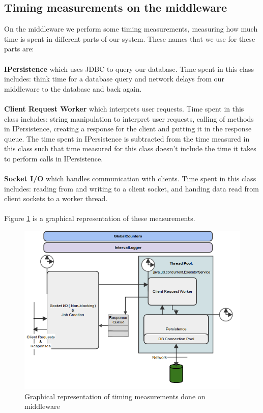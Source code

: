 \documentclass{article}
\begin{document}
        \subsection{Timing measurements on the middleware}
            On the middleware we perform some timing measurements, measuring how much time is spent in different parts of our system. These names that we use for these parts are:\\
            \\
            \indent \textbf{IPersistence} which uses JDBC to query our database. Time spent in this class includes: think time for a database query and network delays from our middleware to the database and back again.\\
            \\
            \indent \textbf{Client Request Worker} which interprets user requests. Time spent in this class includes: string manipulation to interpret user requests, calling of methods in IPersistence, creating a response for the client and putting it in the response queue. The time spent in IPersistence is subtracted from the time measured in this class such that time measured for this class doesn't include the time it takes to perform calls in IPersistence.\\
            \\
            \indent \textbf{Socket I/O} which handles communication with clients. Time spent in this class includes: reading from and writing to a client socket, and handing data read from client sockets to a worker thread.
            \\
            \\
            Figure \ref{fig:timing_measurements} is a graphical representation of these measurements.\\
            \begin{figure}[H]
                \centering
                \includegraphics[scale=0.50]{timing_measurements}
                \caption{Graphical representation of timing measurements done on middleware}
                \label{fig:timing_measurements}
            \end{figure}
\end{document}
